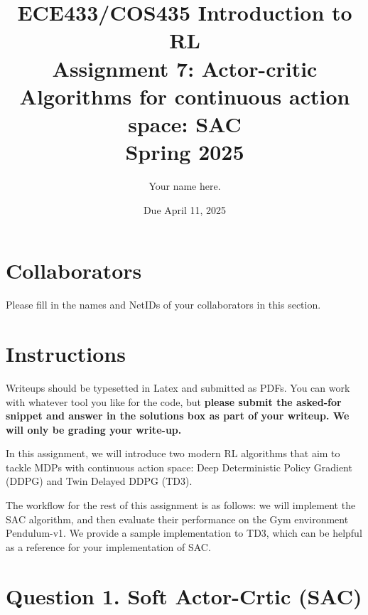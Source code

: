 \documentclass[12pt]{article}
\date{Due April 11, 2025}
\author{\begin{fillme}[width=0.3\textwidth]
 Your name here.
\end{fillme}} %
\title{ECE433/COS435 Introduction to RL\\
  Assignment 7: Actor-critic Algorithms for continuous action space: SAC
\\
  Spring 2025\\
}
\begin{document}
  \maketitle
  \section*{Collaborators}
\begin{fillme}
 Please fill in the names and NetIDs of your collaborators in this section.
\end{fillme}

\section*{Instructions}

Writeups should be typesetted in Latex and submitted as PDFs. You can work with whatever tool you like for the code, but \textbf{please submit the asked-for snippet and answer in the solutions box as part of your writeup. We will only be grading your write-up.}


In this assignment, we will introduce two modern RL algorithms that aim to tackle MDPs with continuous action space: Deep Deterministic Policy Gradient (DDPG) and Twin Delayed DDPG (TD3).

The workflow for the rest of this assignment is as follows: we will implement the SAC algorithm, and then evaluate their performance on the Gym environment Pendulum-v1. We provide a sample implementation to TD3, which can be helpful as a reference for your implementation of SAC. 

\section*{Question 1. Soft Actor-Crtic (SAC)}
\end{document}

